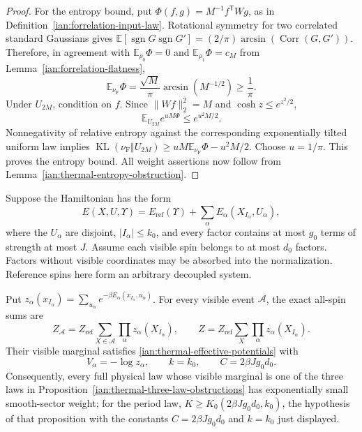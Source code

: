 \begin{proof}
For the entropy bound, put
\(\Phi(f,g)=M^{-1}f^{\mathsf T}Wg\), as in
Definition~\ref{ian:forrelation-input-law}.
Rotational symmetry for two correlated standard Gaussians gives
\(\mathbb E[\operatorname{sgn}G\operatorname{sgn}G']
=(2/\pi)\arcsin(\operatorname{Corr}(G,G'))\).
Therefore, in agreement with \(\mathbb E_{\rho_0}\Phi=0\) and
\(\mathbb E_{\rho_1}\Phi=c_M\) from
Lemma~\ref{ian:forrelation-flatness},
\[
 \mathbb E_{\nu_{\mathrm F}}\Phi
 =\frac{\sqrt M}{\pi}\arcsin(M^{-1/2})
 \ge\frac1\pi.
 \tag{36.21}
\]
Under \(U_{2M}\), condition on \(f\). Since \(\|Wf\|_2^2=M\) and
\(\cosh z\le e^{z^2/2}\),
\[
 \mathbb E_{U_{2M}}e^{uM\Phi}
 \le e^{u^2M/2}.
 \tag{36.22}
\]
Nonnegativity of relative entropy against the corresponding
exponentially tilted uniform law implies
\(\operatorname{KL}(\nu_{\mathrm F}\Vert U_{2M})
\ge uM\mathbb E_{\nu_{\mathrm F}}\Phi-u^2M/2\).
Choose \(u=1/\pi\). This proves the entropy bound.
All weight assertions now follow from
Lemma~\ref{ian:thermal-entropy-obstruction}.
\end{proof}

\begin{lemma}
\label{ian:thermal-independent-gadget-obstruction}
Suppose the Hamiltonian has the form
\[
 E(X,U,\Upsilon)=E_{\mathrm{ref}}(\Upsilon)+
 \sum_{\alpha}E_\alpha(X_{I_\alpha},U_\alpha),
 \tag{36.23}
\]
where the \(U_\alpha\) are disjoint, \(|I_\alpha|\le k_0\), and every
factor contains at most \(g_0\) terms of strength at most \(J\).
Assume each visible spin belongs to at most \(d_0\) factors.
Factors without visible coordinates may be absorbed into the
normalization. Reference spins here form an arbitrary decoupled
system.

Put
\(z_\alpha(x_{I_\alpha})
=\sum_{u_\alpha}e^{-\beta E_\alpha(x_{I_\alpha},u_\alpha)}\).
For every visible event \(\mathcal A\), the exact all-spin sums are
\[
 Z_{\mathcal A}=Z_{\mathrm{ref}}
       \sum_{X\in\mathcal A}\prod_\alpha z_\alpha(X_{I_\alpha}),
 \qquad
 Z=Z_{\mathrm{ref}}
       \sum_X\prod_\alpha z_\alpha(X_{I_\alpha}).
 \tag{36.24}\label{ian:thermal-gadget-partition-sums}
\]
Their visible marginal satisfies
\eqref{ian:thermal-effective-potentials} with
\[
 V_\alpha=-\log z_\alpha,\qquad
 k=k_0,\qquad C=2\beta Jg_0d_0.
 \tag{36.25}
\]
Consequently, every full physical law whose visible marginal is one
of the three laws in
Proposition~\ref{ian:thermal-three-law-obstructions} has exponentially
small smooth-sector weight; for the period law,
\(K\ge K_0(2\beta Jg_0d_0,k_0)\), the hypothesis of that proposition
with the constants \(C=2\beta Jg_0d_0\) and \(k=k_0\) just displayed.
\end{lemma}

